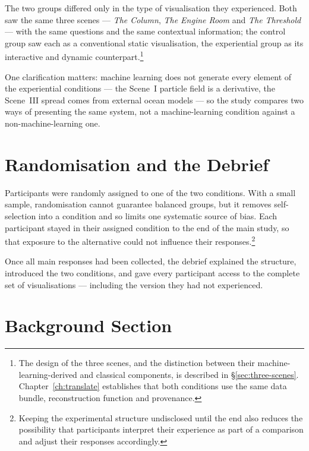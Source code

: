 The two groups differed only in the type of visualisation they experienced. Both saw the same three scenes --- \textit{The Column}, \textit{The Engine Room} and \textit{The Threshold} --- with the same questions and the same contextual information; the control group saw each as a conventional static visualisation, the experiential group as its interactive and dynamic counterpart.\footnote{The design of the three scenes, and the distinction between their machine-learning-derived and classical components, is described in \S\ref{sec:three-scenes}. Chapter~\ref{ch:translate} establishes that both conditions use the same data bundle, reconstruction function and provenance.}

One clarification matters: machine learning does not generate every element of the experiential conditions --- the Scene~I particle field is a derivative, the Scene~III spread comes from external ocean models --- so the study compares two ways of presenting the same system, not a machine-learning condition against a non-machine-learning one.

\section{Randomisation and the Debrief}
\label{sec:eval-randomisation}

Participants were randomly assigned to one of the two conditions. With a small sample, randomisation cannot guarantee balanced groups, but it removes self-selection into a condition and so limits one systematic source of bias. Each participant stayed in their assigned condition to the end of the main study, so that exposure to the alternative could not influence their responses.\footnote{Keeping the experimental structure undisclosed until the end also reduces the possibility that participants interpret their experience as part of a comparison and adjust their responses accordingly.}

Once all main responses had been collected, the debrief explained the structure, introduced the two conditions, and gave every participant access to the complete set of visualisations --- including the version they had not experienced.

\section{Background Section}
\label{sec:eval-demographics}

